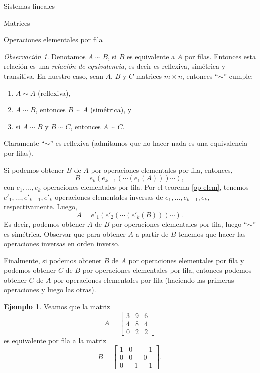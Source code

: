 \documentclass[a4paper,12pt,twoside,spanish]{amsbook}
\theoremstyle{definition}
\newtheorem{ejemplo}{Ejemplo}[section]
\theoremstyle{remark}
\newtheorem{obs}{Observaci\'on}[section]
\begin{document}
\begin{chapter}{Sistemas lineales}
\begin{section}{Matrices}
\begin{subsection}{Operaciones elementales por fila}
				\begin{obs} Denotamos $A \sim B$, si $B$ es equivalente a $A$ por filas. Entonces esta relación es una \textit{relación de equivalencia}, es decir es reflexiva, simétrica y transitiva. En  nuestro caso, sean $A$, $B$ y $C$ matrices $m \times n$, entonces ``$\sim$'' cumple: 
					\begin{enumerate}
						\item  $A \sim A$ (reflexiva), 
						\item $A \sim B$, entonces $B \sim A$ (simétrica), y
						\item si $A \sim B$ y $B \sim C$, entonces $A \sim C$.   
					\end{enumerate}
					Claramente ``$\sim$'' es reflexiva (admitamos que no hacer nada es una equivalencia por filas). 
					
					Si podemos obtener $B$ de $A$ por operaciones elementales por fila, entonces, 
					$$
					B = e_k(e_{k-1}(\cdots(e_1(A)))\cdots),
					$$
					con $e_1,\ldots,e_k$ operaciones elementales por fila. Por el teorema \ref{op-elem},  tenemos $e'_1,\ldots,e'_{k-1},e'_k$ operaciones elementales inversas de  $e_1,\ldots,e_{k-1},e_k$, respectivamente. Luego, 
					$$
					A = e'_1(e'_{2}(\cdots(e'_k(B)))\cdots).
					$$
					Es decir, podemos  obtener $A$ de $B$ por operaciones elementales por fila, luego ``$\sim$'' es simétrica. Observar que para obtener $A$ a partir de $B$ tenemos que hacer las operaciones inversas en orden inverso. 
					
					Finalmente,   si podemos obtener $B$ de $A$ por operaciones elementales por fila y  podemos obtener $C$ de $B$ por operaciones elementales por fila, entonces podemos obtener $C$ de $A$ por operaciones elementales por fila (haciendo las primeras operaciones y luego las otras).
				\end{obs}
				
				\begin{ejemplo}
					Veamos que la matriz 
					\begin{equation*}
					A= 	\begin{bmatrix}
					3 & 9 & 6 \\ 4&8&4 \\ 0&2&2
					\end{bmatrix}
					\end{equation*}
					es equivalente por fila a la matriz
					\begin{equation*}
					B = \begin{bmatrix}
					1&0&-1 \\ 0&0&0\\  0&-1&-1
					\end{bmatrix}.
					\end{equation*}
						\end{ejemplo}
					

\end{subsection}
\end{section}
\end{chapter}
\end{document}

